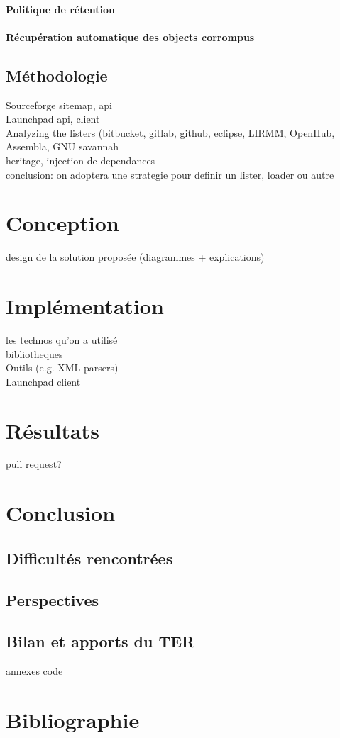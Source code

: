 \documentclass[12pt,a4paper]{report}
\begin{document}
		\subsubsection{Politique de rétention}
		\subsubsection{Récupération automatique des objects corrompus}
\section{Méthodologie}		
	Sourceforge sitemap, api\\
	Launchpad api, client\\
	Analyzing the listers (bitbucket, gitlab, github, eclipse, LIRMM, OpenHub, 			Assembla, GNU savannah\\
	heritage, injection de dependances\\
	conclusion: on adoptera une strategie pour definir un lister, loader ou autre\\
\chapter{Conception}
	design de la solution proposée (diagrammes + explications)
\chapter{Implémentation}
	les technos qu'on a utilisé\\
	bibliotheques\\
	Outils (e.g. XML parsers)\\
	Launchpad client
	
\chapter{Résultats}
	pull request?
\chapter{Conclusion}
	\section{Difficultés rencontrées}
	\section{Perspectives}
	\section{Bilan et apports du TER}	
annexes
code	
\chapter*{Bibliographie}
\end{document}
